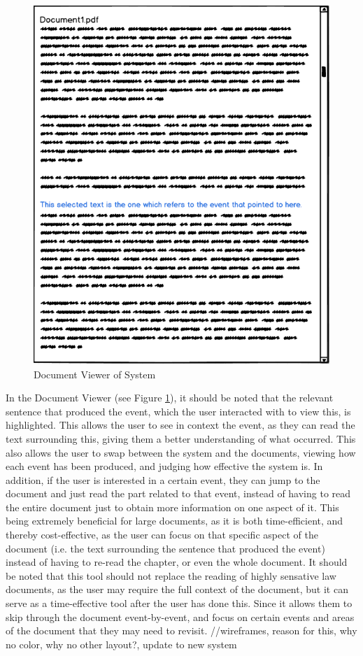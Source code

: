 \begin{figure}[h]
\caption{Document Viewer of System}
\label{fig:viewDoc}
\includegraphics[scale=0.75]{viewDoc.png}
\centering
\end{figure}
\par In the Document Viewer (see Figure \ref{fig:viewDoc}), it should be noted that the relevant sentence that produced the event, which the user interacted with to view this, is highlighted. This allows the user to see in context the event, as they can read the text surrounding this, giving them a better understanding of what occurred. This also allows the user to swap between the system and the documents, viewing how each event has been produced, and judging how effective the system is. In addition, if the user is interested in a certain event, they can jump to the document and just read the part related to that event, instead of having to read the entire document just to obtain more information on one aspect of it. This being extremely beneficial for large documents, as it is both time-efficient, and thereby cost-effective, as the user can focus on that specific aspect of the document (i.e. the text surrounding the sentence that produced the event) instead of having to re-read the chapter, or even the whole document. It should be noted that this tool should not replace the reading of highly sensative law documents, as the user may require the full context of the document, but it can serve as a time-effective tool after the user has done this. Since it allows them to skip through the document event-by-event, and focus on certain events and areas of the document that they may need to revisit.
//wireframes, reason for this, why no color, why no other layout?, update to new system










